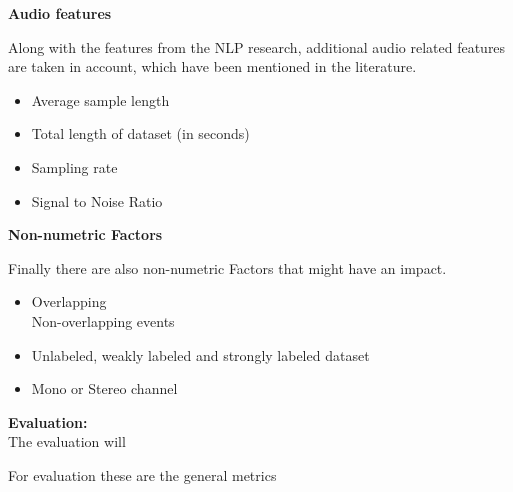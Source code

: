 	\textbf{Audio features}
	
	Along with the features from the NLP research, additional audio related features are taken in account, which have been mentioned in the literature.
	\begin{itemize}
		\item Average sample length
		\item Total length of dataset (in seconds)
		\item Sampling rate
		\item Signal to Noise Ratio
	\end{itemize}
	
	\textbf{Non-numetric Factors}
	
	Finally there are also non-numetric Factors that might have an impact. 
	\begin{itemize}
		\item Overlapping\\Non-overlapping events
		\item Unlabeled, weakly labeled and strongly labeled dataset
		\item Mono or Stereo channel
	\end{itemize}
	
	\textbf{Evaluation:}\\
	
	The evaluation will 
	
	For evaluation these are the general metrics
	
